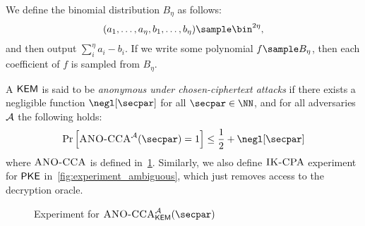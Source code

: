 \begin{definition}
We define the binomial distribution $B_\eta$ as follows:
$$(a_1,\dots, a_\eta, b_1, \dots, b_\eta) \sample \bin^{2\eta},$$
and then output $\sum_i^\eta a_i-b_i$. If we write some polynomial $f\sample B_\eta$, then each coefficient of $f$ is sampled from $B_\eta$.
\end{definition}

\begin{definition}\label{def:anocca}
A $\mathsf{KEM}$ is said to be \emph{anonymous under chosen-ciphertext attacks} if there exists a negligible function $\negl[\secpar]$ for all $\secpar\in\NN$, and for all adversaries $\mathcal{A}$ the following holds:
$$\Pr\left[\anocca^\Ac(\secpar)=1\right]\le \frac{1}{2} + \negl[\secpar]
$$
where $\textsc{ANO-CCA}$ is defined in~\cref{fig:experiment_anonymous_ke}. Similarly, we also define $\textsc{IK-CPA}$ experiment for $\mathsf{PKE}$ in~\cref{fig:experiment_ambiguous}, which just removes access to the decryption oracle\cite{AC:BBDP01}.
\end{definition}

\begin{figure}[!t]
    \centering
    \begin{pchstack}[boxed]
    \begin{pcvstack}
    \end{pcvstack}
    \pchspace
    \end{pchstack}
    \caption{Experiment for $\anocca^\Ac_\kem(\secpar)$}
    \label{fig:experiment_anonymous_ke}
\end{figure}

